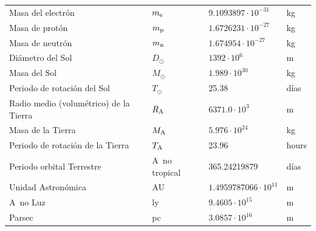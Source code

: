\begin{center}
\begin{tabular}{||l|lll||}
Masa del electrón     &$m_{\rm e}$&$9.1093897\cdot10^{-31}$&kg\rule{0pt}{13pt}\\
Masa de protón        &$m_{\rm p}$&$1.6726231\cdot10^{-27}$&kg\\
Masa de neutrón      &$m_{\rm n}$&$1.674954\cdot10^{-27}$&kg\\
\hline
Diámetro del Sol       &$D_\odot$&$1392\cdot10^6$&m\rule{0pt}{13pt}\\
Masa del Sol             &$M_\odot$&$1.989\cdot10^{30}$&kg\\
Periodo de rotación del Sol &$T_\odot$&25.38&días\\
Radio medio (volumétrico) de la Tierra     &$R_{\rm A}$&$6371.0\cdot10^3$&m\\
Masa de la Tierra     &$M_{\rm A}$&$5.976\cdot10^{24}$&kg\\
Periodo de rotación de la Tierra   &$T_{\rm A}$&23.96&hours\\
Periodo orbital Terrestre        &A~no tropical&365.24219879&días\\
Unidad Astronómica            &AU&$1.4959787066\cdot10^{11}$&m\\
A~no Luz                   &ly&$9.4605\cdot10^{15}$&m\\
Parsec                       &pc&$3.0857\cdot10^{16}$&m\\
\hline
\end{tabular}
\end{center}
